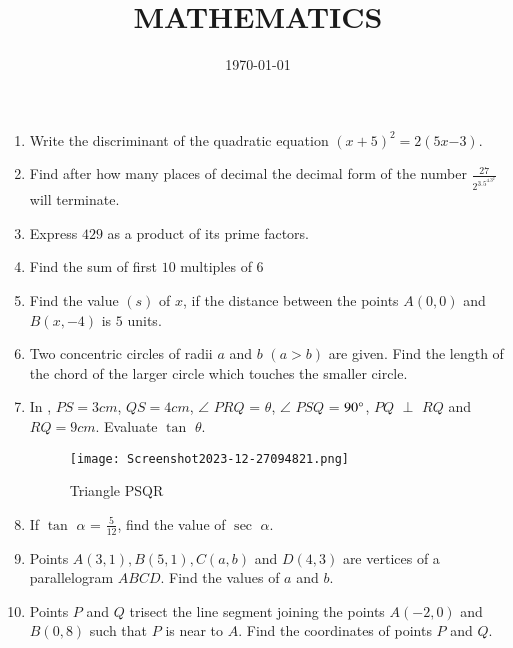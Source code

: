 \documentclass[2pt,-letter paper]{article}
\title{MATHEMATICS}
\author{}
\providecommand{\brak}[1]{\ensuremath{\left(#1\right)}}
\begin{document}
\maketitle


\date{\today}
\begin{enumerate}
 

\item Write the discriminant of the quadratic equation $\brak {x + 5}^2 = 2 \brak {5x {-3}}$.

\item Find after how many places of decimal the decimal form of the number
$\frac {27}{2^3.5^4.3^2}$ will terminate.

\item Express $429$ as a product of its prime factors.

\item Find the sum of first $10$ multiples of $6$

\item Find the value $\brak{s}$ of $x$, if the distance between the points $A\brak{0, 0}$ and $B \brak{x,-4}$  is $5$ units.

\item Two concentric circles of radii $a$ and $b$ $\brak{a > b}$ are given. Find the length of the chord of the larger circle which touches the smaller circle.

\item In , $PS = 3 cm$, $QS = 4 cm$, $\angle$ $PRQ$ = $\theta$, $\angle$ $PSQ$ = $90\degree$, $PQ$ $\perp$ $RQ$ and $RQ = 9 cm$. Evaluate $\tan$ $\theta$.
\begin{figure}[H]
    \centering
    \texttt{[image: Screenshot2023-12-27094821.png]}
     \caption{Triangle PSQR}
    \label{fig:Fig_1}
\end{figure}



\item If $\tan$ $\alpha$ = ${\frac {5}{12}}$, find the value of $\sec$ $\alpha$.

\item Points $A\brak{3, 1}, B\brak{5, 1},C\brak{a, b}$ and $D\brak{4, 3}$ are vertices of a parallelogram $ABCD$. Find the values of $a$ and $b$.

\item Points $P$ and $Q$ trisect the line segment joining the points $A\brak{-2, 0}$ and $B\brak{0, 8}$ such that $P$ is near to $A$. Find the coordinates of points $P$ and $Q$.


\end{enumerate}
\end{document}
